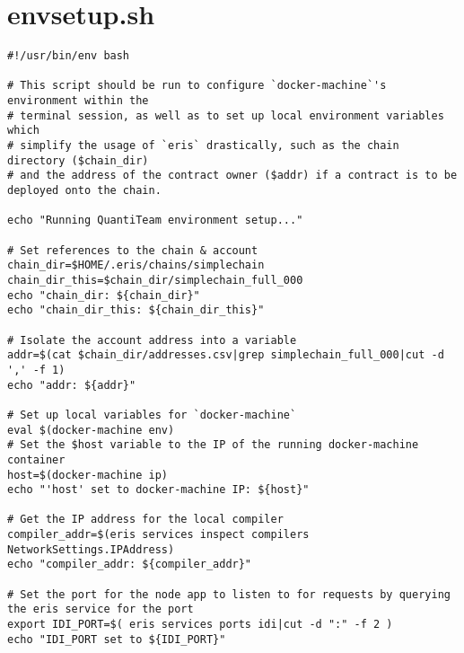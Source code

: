 \section{envsetup.sh}
\begin{lstlisting}
#!/usr/bin/env bash

# This script should be run to configure `docker-machine`'s environment within the
# terminal session, as well as to set up local environment variables which
# simplify the usage of `eris` drastically, such as the chain directory ($chain_dir)
# and the address of the contract owner ($addr) if a contract is to be deployed onto the chain.

echo "Running QuantiTeam environment setup..."

# Set references to the chain & account
chain_dir=$HOME/.eris/chains/simplechain
chain_dir_this=$chain_dir/simplechain_full_000
echo "chain_dir: ${chain_dir}"
echo "chain_dir_this: ${chain_dir_this}"

# Isolate the account address into a variable
addr=$(cat $chain_dir/addresses.csv|grep simplechain_full_000|cut -d ',' -f 1)
echo "addr: ${addr}"

# Set up local variables for `docker-machine`
eval $(docker-machine env)
# Set the $host variable to the IP of the running docker-machine container
host=$(docker-machine ip)
echo "'host' set to docker-machine IP: ${host}"

# Get the IP address for the local compiler
compiler_addr=$(eris services inspect compilers NetworkSettings.IPAddress)
echo "compiler_addr: ${compiler_addr}"

# Set the port for the node app to listen to for requests by querying the eris service for the port
export IDI_PORT=$( eris services ports idi|cut -d ":" -f 2 )
echo "IDI_PORT set to ${IDI_PORT}"
\end{lstlisting}

